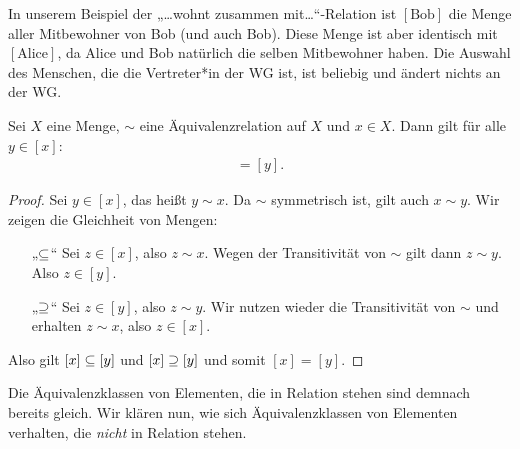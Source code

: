 In unserem Beispiel der „…wohnt zusammen mit…“-Relation ist
$[ \text{Bob} ]$ die Menge aller Mitbewohner von Bob (und auch Bob). Diese
Menge ist aber identisch mit $[ \text{Alice} ]$, da Alice und Bob natürlich
die selben Mitbewohner haben. Die Auswahl des Menschen, die die
Vertreter*in der WG ist, ist beliebig und ändert nichts an der WG.


\begin{bem}
\label{bem:vertreter}

  Sei $X$ eine Menge, $\sim$ eine Äquivalenzrelation auf $X$ und $x\in
  X$. Dann gilt für alle $y \in [ x ]$:
  \begin{align*}
    [ x ] =  [ y ].
  \end{align*}
  
  \begin{proof}

    Sei $y\in [ x ]$, das heißt $y\sim x$. Da $\sim$ symmetrisch ist,
    gilt auch $x\sim y$. Wir zeigen die Gleichheit von Mengen:

    \begin{itemize}

      \item[„$\subseteq$“] Sei $z \in [ x ]$, also $z\sim x$. Wegen der
        Transitivität von $\sim$ gilt dann $z\sim y$. Also $z \in [ y ]$.

      \item[„$\supseteq$“] Sei $z \in [ y ]$, also $z\sim y$. Wir nutzen wieder
        die Transitivität von $\sim$ und erhalten $z\sim x$, also
        $z\in [ x ]$.

    \end{itemize}
    
    \noindent Also gilt $[ x ] \subseteq  [ y ]$ und $[ x ] \supseteq  [ y ]$ und
    somit $[ x ] = [ y ]$.

  \end{proof}
  
\end{bem}


Die Äquivalenzklassen von Elementen, die in Relation stehen sind demnach
bereits gleich. Wir klären nun, wie sich Äquivalenzklassen von Elementen
verhalten, die \emph{nicht} in Relation stehen.


